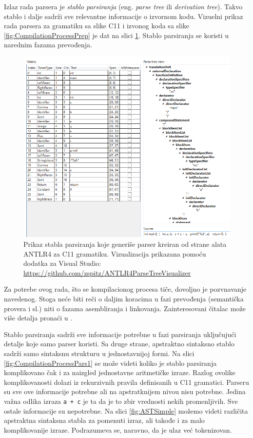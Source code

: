 Izlaz rada parsera je \emph{stablo parsiranja} (eng. \emph{parse tree} 
ili \emph{derivation tree}). Takvo stablo i dalje sadrži sve relevantne
informacije o izvornom kodu. Vizuelni prikaz rada parsera za gramatiku
sa slike C11 i izvonog koda sa slike \ref{fig:CompilationProcessPrep} je
dat na slici \ref{fig:CompilationProcessPars}. Stablo parsiranja se 
koristi u narednim fazama prevođenja.

\begin{figure}[h!]
    \centering
    \includegraphics[scale=0.5]{images/parse_tree.png}
    \caption{Prikaz stabla parsiranja koje generiše parser kreiran od strane 
    alata ANTLR4 za C11 gramatiku. Vizualizacija prikazana pomoću dodatka 
    za Visual Studio: \url{https://github.com/zspitz/ANTLR4ParseTreeVisualizer}}
    \label{fig:CompilationProcessPars}
\end{figure}

Za potrebe ovog rada, što se kompilacionog procesa tiče, dovoljno je 
pozvnavanje navedenog. Stoga neće biti reči o daljim koracima u fazi 
prevođenja (semantička provera i sl.) niti o fazama asembliranja i 
linkovanja. Zainteresovani čitalac može više detalja pronaći u 
\cite{CompilerConstruction}. 

Stablo parsiranja sadrži sve informacije potrebne u fazi parsiranja
uključujući detalje koje samo parser koristi. Sa druge strane, 
apstraktno sintaksno stablo sadrži samo sintaksnu strukturu u 
jednostavnijoj formi. Na slici \ref{fig:CompilationProcessPars1} se
može videti koliko je stablo parsiranja komplikovano čak i za naizgled
jednostavne aritmetičke izraze. Razlog ovolike komplikovanosti dolazi 
iz rekurzivnih pravila definisanih u C11 gramatici. Parseru su sve
ove informacije potrebne ali na apstratknijem nivou nisu potrebne.
Jedina važna odlika izraza \texttt{a + c} je ta da je to zbir 
vrednosti nekih promenljivih. Sve ostale informacije su nepotrebne.
Na slici \ref{fig:ASTSimple} možemo videti različita apstraktna 
sintaksna stabla za pomenuti izraz, ali takođe i za malo 
komplikovanije izraze. Podrazumeva se, naravno, da je ulaz već 
tokenizovan. 


